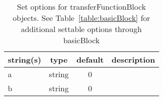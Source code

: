 \begin{table}[ht]
\centering
\begin{tabular}{p{5cm} c c p{7cm}}
\hline
string(s) & type & default & description \\
\hline
a & string & 0 & \\
b & string & 0 & \\
\hline
\end{tabular}
\caption{Set options for transferFunctionBlock objects. See Table~\ref{table:basicBlock} for additional settable options through basicBlock}
\label{table:transferFunctionBlock}
\end{table}

